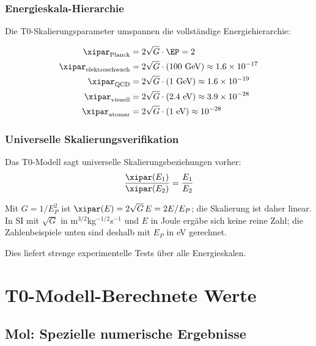 	\subsubsection{Energieskala-Hierarchie}
	\label{subsubsec:energieskala_hierarchie}
	
	Die T0-Skalierungsparameter umspannen die vollständige Energiehierarchie:
	
	\begin{align}
		\xipar_{\text{Planck}} &= 2\sqrt{G} \cdot \EP = 2 \\
		\xipar_{\text{elektroschwach}} &= 2\sqrt{G} \cdot (100 \text{ GeV}) \approx 1.6 \times 10^{-17} \\
		\xipar_{\text{QCD}} &= 2\sqrt{G} \cdot (1 \text{ GeV}) \approx 1.6 \times 10^{-19} \\
		\xipar_{\text{visuell}} &= 2\sqrt{G} \cdot (2.4 \text{ eV}) \approx 3.9 \times 10^{-28} \\
		\xipar_{\text{atomar}} &= 2\sqrt{G} \cdot (1 \text{ eV}) \approx 10^{-28}
	\end{align}
	
	\subsubsection{Universelle Skalierungsverifikation}
	\label{subsubsec:universelle_skalierungsverifikation}
	
	Das T0-Modell sagt universelle Skalierungsbeziehungen vorher:
	\begin{equation}
		\frac{\xipar(E_1)}{\xipar(E_2)} = \frac{E_1}{E_2}
		\label{eq:universeller_skalierungstest}
	\end{equation}
	
	Mit $G = 1/E_P^2$ ist $\xipar(E) = 2\sqrt{G}\,E = 2E/E_P$; die Skalierung ist daher linear. In SI mit $\sqrt{G}$ in m$^{3/2}$kg$^{-1/2}$s$^{-1}$ und $E$ in Joule ergäbe sich keine reine Zahl; die Zahlenbeispiele unten sind deshalb mit $E_P$ in eV gerechnet.
	
	Dies liefert strenge experimentelle Tests über alle Energieskalen.
	
	\section{T0-Modell-Berechnete Werte}
	\label{sec:t0_berechnete_werte}
	
	\subsection{Mol: Spezielle numerische Ergebnisse}
	\label{subsec:mol_numerische_ergebnisse}
	
